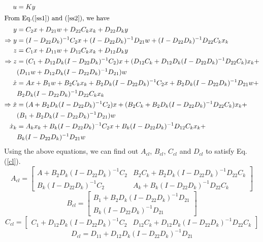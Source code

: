 \documentclass[a4paper,12pt]{article}
\begin{document}
		\\
		\begin{align*}
		u&=Ky \\
		\intertext{From Eq.(\ref{ss1}) and (\ref{ss2}), we have}
		y &= C_{2}x + D_{21}w+D_{22}C_{k}x_{k} + D_{22}D_{k}y\\
		\Rightarrow y &= (I-D_{22}D_{k})^{-1}C_{2}x + (I-D_{22}D_{k})^{-1}D_{21}w  + (I-D_{22}D_{k})^{-1}D_{22}C_{k}x_{k} \\
		z&=C_{1}x+D_{11}w+D_{12}C_{k}x_{k}+D_{12}D_{k}y\\
		\Rightarrow z&=(C_{1} + D_{12}D_{k}(I-D_{22}D_{k})^{-1}C_{2})x+ (D_{12}C_{k}+ D_{12}D_{k}(I-D_{22}D_{k})^{-1}D_{22}C_{k})x_{k} + \\& (D_{11}w+D_{12}D_{k}(I-D_{22}D_{k})^{-1}D_{21})w\\
		\dot{x}&=Ax+B_{1}w+B_{2}C_{k}x_{k} + B_{2}D_{k}(I-D_{22}D_{k})^{-1}C_{2}x+ B_{2}D_{k}(I-D_{22}D_{k})^{-1}D_{21}w + \\& B_{2}D_{k}(I-D_{22}D_{k})^{-1}D_{22}C_{k}x_{k}\\
		\Rightarrow \dot{x} &= (A+B_{2}D_{k}(I-D_{22}D_{k})^{-1}C_{2})x+(B_{2}C_{k}+ B_{2}D_{k}(I-D_{22}D_{k})^{-1}D_{22}C_{k})x_{k} + \\& (B_{1} + B_{2}D_{k}(I-D_{22}D_{k})^{-1}D_{21})w\\
		\dot{x}_{k}&=A_{k}x_{k} + B_{k}(I-D_{22}D_{k})^{-1}C_{2}x + B_{k}(I-D_{22}D_{k})^{-1}D_{12}C_{k}x_{k}+ \\&B_{k}(I-D_{22}D_{k})^{-1}D_{21}w
		\end{align*}
		Using the above equations, we can find out $A_{cl}$, $B_{cl}$, $C_{cl}$ and $D_{cl}$ to satisfy Eq.(\ref{cl}). 
		\[
		A_{cl} = \begin{bmatrix}
		A + B_{2}D_{k}(I-D_{22}D_{k})^{-1}C_{2} & B_{2}C_{k} + B_{2}D_{k}(I-D_{22}D_{k})^{-1}D_{22}C_{k} \\
		B_{k}(I-D_{22}D_{k})^{-1}C_{2} & A_{k} + B_{k}(I-D_{22}D_{k})^{-1}D_{22}C_{k}
		\end{bmatrix}
		\]
		\[
		B_{cl} = \begin{bmatrix}
		B_{1}+B_{2}D_{k}(I-D_{22}D_{k})^{-1}D_{21} \\
		B_{k}(I-D_{22}D_{k})^{-1}D_{21}
		\end{bmatrix}
		\]
		\[
		C_{cl} = \begin{bmatrix} 
		C_{1} + D_{12}D_{k}(I-D_{22}D_{k})^{-1}C_{2} & D_{12}C_{k} + D_{12}D_{k}(I-D_{22}D_{k})^{-1}D_{22}C_{k}
		\end{bmatrix}
		\]
		\[
		D_{cl}=D_{11}+D_{12}D_{k}(I-D_{22}D_{k})^{-1}D_{21}
		\]
		
\end{document}
